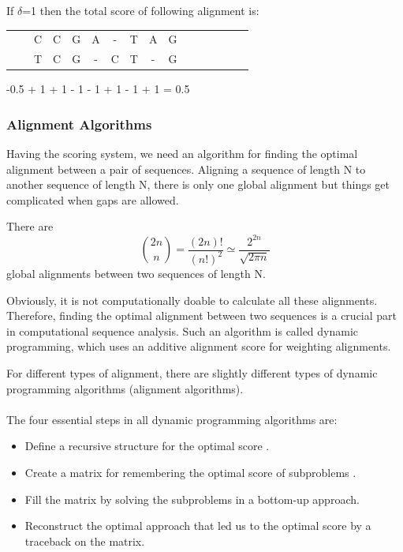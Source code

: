 \documentclass[11pt,a4paper]{report}
\begin{document}
If $\delta$=1 then the total score of following alignment is:
 
\begin{center}
	\begin{tabular}{c *{12}cccc}
        & & C & C & G & A & - & T & A & G && \\
 	  & & T  & C & G &  -  & C   &  T & -  & G & \\
    	                                 
	\end{tabular}
\end{center} 

-0.5 + 1 + 1 - 1 - 1 + 1 - 1 + 1 = 0.5




\subsubsection{Alignment Algorithms} \label{Alignment Algorithms}
Having the scoring system, we need an algorithm for finding the 
optimal alignment between a pair of sequences. 
Aligning a sequence of length N to another sequence of length N,
there is only one global alignment but things get complicated when 
gaps are allowed.
 
There are \cite{durbin}
$$ \binom{2n}{n} = \frac{(2n)!}{(n!)^2} \simeq \frac{2^{2n}}
{\sqrt{2\pi n}} $$
global alignments between two sequences of length N.

Obviously, it is not computationally doable to calculate all these
alignments. Therefore, finding the optimal alignment between two 
sequences is a crucial part in computational sequence analysis.
Such an algorithm is called dynamic programming, which uses an 
additive alignment score for  weighting alignments. 

For different types of alignment, there are slightly different 
types of dynamic programming algorithms (alignment algorithms).\\\\


The four essential steps in all dynamic programming algorithms are:

\begin{itemize} 
	\item Define a recursive structure for the optimal score
	\cite{eddydynamic}.
	\item  Create a  matrix for remembering the optimal score 
	of subproblems \cite{eddydynamic}.	
	\item Fill the matrix by solving the  subproblems in a 
	bottom-up approach\cite{eddydynamic}.
	\item Reconstruct the optimal approach that led us to the 
	optimal score by a traceback on the matrix\cite{eddydynamic}.
\end{itemize}
\end{document}
